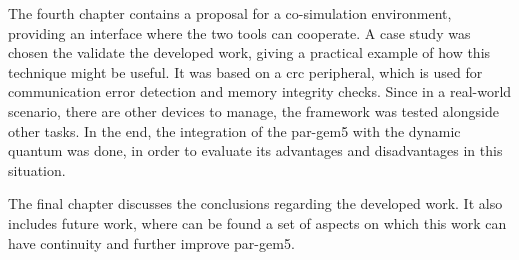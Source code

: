 The fourth chapter contains a proposal for a co-simulation environment, providing an interface where the two tools can cooperate. 
A case study was chosen the validate the developed work, giving a practical example of how this technique might be useful. 
It was based on a \gls{crc} peripheral, which is used for communication error detection and memory integrity checks. 
Since in a real-world scenario, there are other devices to manage, the framework was tested alongside other tasks. In the end, the integration
of the par-gem5 with the dynamic quantum was done, in order to evaluate its advantages and disadvantages in this situation. 

The final chapter discusses the conclusions regarding the developed work. It also includes future work, where can be found a set of 
aspects on which this work can have continuity and further improve par-gem5. 


